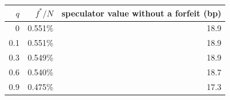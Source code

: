 \begin{tabular}{|r|r|r|}
\hline
\rowcolor{gray!15}$q$ & $f^*/N$ & speculator value without a forfeit (bp) \\
\hline
0 & 0.551\% & 18.9 \\
\hline
0.1 & 0.551\% & 18.9 \\
\hline
0.3 & 0.549\% & 18.9 \\
\hline
0.6 & 0.540\% & 18.7 \\
\hline
0.9 & 0.475\% & 17.3 \\
\hline
\end{tabular}
